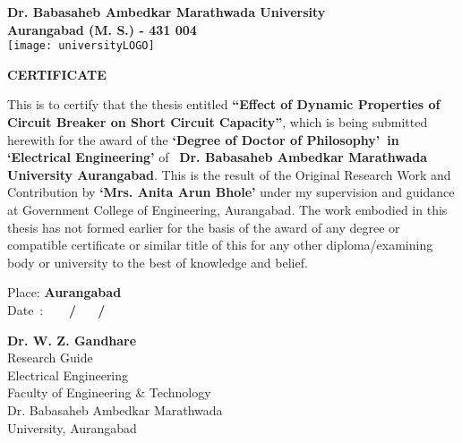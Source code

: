 \clearpage

\begin{center}
\large \textbf{Dr. Babasaheb Ambedkar Marathwada University\\
Aurangabad (M. S.) - 431 004}\\
\vspace{0.5cm}
\texttt{[image: universityLOGO]}\\
\vspace{0.5cm}


\textbf{\large CERTIFICATE}\\
\end{center}
\normalsize This is to certify that the thesis entitled \textbf{\textquotedblleft Effect of Dynamic Properties of Circuit Breaker on Short Circuit Capacity\textquotedblright}, which is being submitted herewith for the award of the \textbf{\textquoteleft Degree of Doctor of Philosophy\textquoteright ~in \textquoteleft Electrical Engineering\textquoteright} of~ \textbf{Dr. Babasaheb Ambedkar Marathwada University Aurangabad}. This is the result of the Original Research Work and Contribution by \textbf{\textquoteleft Mrs. Anita Arun Bhole\textquoteright} under my supervision and guidance at Government College of Engineering, Aurangabad. The work embodied in this thesis has not formed earlier for the basis of the award of any degree or compatible certificate or similar title of this for any other diploma/examining body or university to the best of knowledge and belief. 

\vspace{0.5cm}
Place: \textbf{Aurangabad}\\
Date~: \textbf{~~~/~~~/}\\

\hspace{2.2in}
\begin{minipage}{4in}
\vspace{0.5in}
\begin{center}
\textbf{Dr. W. Z. Gandhare}\\
Research Guide\\
Electrical Engineering\\
Faculty of Engineering \& Technology\\
Dr. Babasaheb Ambedkar Marathwada\\University, Aurangabad\\
\end{center}
\end{minipage}

